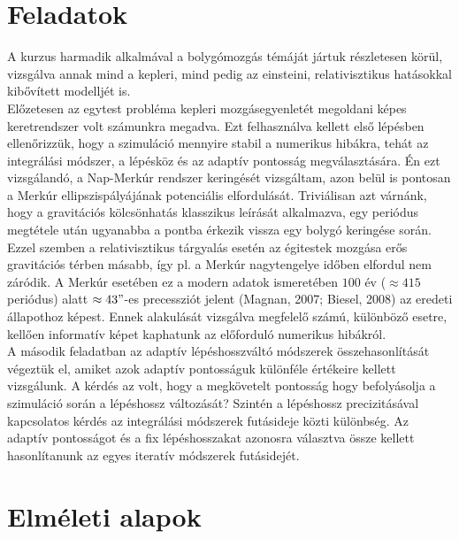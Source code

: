 \begin{multicols}{2}

\section{Feladatok} \label{sec:1}
A kurzus harmadik alkalmával a bolygómozgás témáját jártuk részletesen körül, vizsgálva annak mind a kepleri, mind pedig az einsteini, relativisztikus hatásokkal kibővített modelljét is.\\
Előzetesen az egytest probléma kepleri mozgásegyenletét megoldani képes keretrendszer volt számunkra megadva. Ezt felhasználva kellett első lépésben ellenőrizzük, hogy a szimuláció mennyire stabil a numerikus hibákra, tehát az integrálási módszer, a lépésköz és az adaptív pontosság megválasztására. Én ezt vizsgálandó, a Nap-Merkúr rendszer keringését vizsgáltam, azon belül is pontosan a Merkúr ellipszispályájának potenciális elfordulását. Triviálisan azt várnánk, hogy a gravitációs kölcsönhatás klasszikus leírását alkalmazva, egy periódus megtétele után ugyanabba a pontba érkezik vissza egy bolygó keringése során. Ezzel szemben a relativisztikus tárgyalás esetén az égitestek mozgása erős gravitációs térben másabb, így pl. a Merkúr nagytengelye időben elfordul nem záródik. A Merkúr esetében ez a modern adatok ismeretében $100$ év ($\approx 415$ periódus) alatt $\approx 43"$-es precessziót jelent (Magnan, 2007\cite{2007arXiv0712.3709M}; Biesel, 2008\cite{biesel2008precession}) az eredeti állapothoz képest. Ennek alakulását vizsgálva megfelelő számú, különböző esetre, kellően informatív képet kaphatunk az előforduló numerikus hibákról. \\
A második feladatban az adaptív lépéshosszváltó módszerek összehasonlítását végeztük el, amiket azok adaptív pontosságuk különféle értékeire kellett vizsgálunk. A kérdés az volt, hogy a megkövetelt pontosság hogy befolyásolja a szimuláció során a lépéshossz változását? Szintén a lépéshossz precizitásával kapcsolatos kérdés az integrálási módszerek futásideje közti különbség. Az adaptív pontosságot és a fix lépéshosszakat azonosra választva össze kellett hasonlítanunk az egyes iteratív módszerek futásidejét. \\


\section{Elméleti alapok} \label{sec:2}

\end{multicols}
